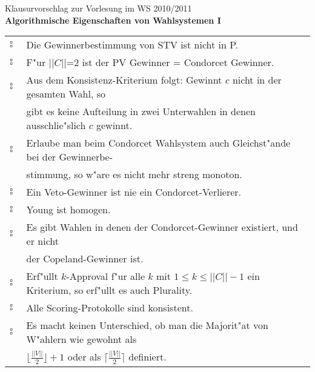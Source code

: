 \documentclass[a4paper,12pt,titlepage,oneside]{article}
\begin{document}
\vspace{0.5cm}

\begin{center}
{\Large Klausurvorschlag zur Vorlesung im WS 2010/2011} \\
{\LARGE \bf Algorithmische Eigenschaften von Wahlsystemen I} \\
\end{center}
\vspace{0.5cm}


\newline 
\begin{tabular}{ll}
$\square$ $\square$&Die Gewinnerbestimmung von STV ist nicht in P.\\
$\square$ $\square$&F"ur ||$C$||=2 ist der PV Gewinner = Condorcet Gewinner.\\
$\square$ $\square$&Aus dem Konsistenz-Kriterium folgt: Gewinnt $c$ nicht in der gesamten Wahl, so\\&gibt es keine Aufteilung in zwei Unterwahlen in denen ausschlie"slich $c$ gewinnt.\\
$\square$ $\square$&Erlaube man beim Condorcet Wahlsystem auch Gleichst"ande bei der Gewinnerbe-\\&stimmung, so w"are es nicht mehr streng monoton.\\
$\square$ $\square$&Ein Veto-Gewinner ist nie ein Condorcet-Verlierer.\\
$\square$ $\square$&Young ist homogen.\\
$\square$ $\square$&Es gibt Wahlen in denen der Condorcet-Gewinner existiert, und er nicht\\&der Copeland-Gewinner ist.\\
$\square$ $\square$&Erf"ullt $k$-Approval f"ur alle $k$ mit $1 \leq k \leq ||C||-1$ ein Kriterium, so erf"ullt es auch Plurality.\\
$\square$ $\square$&Alle Scoring-Protokolle sind konsistent.\\
$\square$ $\square$&Es macht keinen Unterschied, ob man die Majorit"at von W"ahlern wie gewohnt als\\&$\lfloor {\frac{||V||}{2}} \rfloor +1$ oder als $\lceil{\frac{||V||}{2}} \rceil$ definiert.\\
\end{tabular}

\vspace{0.5cm}
\end{document}
